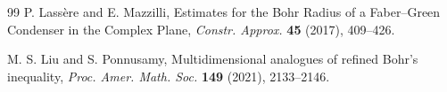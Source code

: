\documentclass[a4paper,12pt]{amsart}
\theoremstyle{definition}
\begin{document}
\begin{thebibliography}{99}
	 {\sc P. Lassère} and {E. Mazzilli}, Estimates for the Bohr Radius of a Faber–Green Condenser in the Complex Plane, {\it Constr. Approx.} {\bf 45} (2017), 409--426.
	
	
	
	
	
	
	
	
	
	
	 {\sc M. S. Liu} and {\sc S. Ponnusamy}, Multidimensional analogues of refined Bohr's inequality, {\it Proc. Amer. Math. Soc.} {\bf 149} (2021), 2133--2146.
	

\end{thebibliography}
\end{document}
